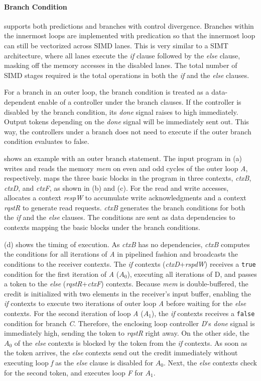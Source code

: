 \paragraph{Branch Condition}
\name supports both predictions and branches with control divergence.
Branches within the innermost loops are implemented with predication so that the innermost loop can still be
vectorized across SIMD lanes.
This is very similar to a SIMT architecture, where all lanes execute the \emph{if} clause followed
by the \emph{else} clause, masking off the memory accesses in the disabled lanes.
The total number of SIMD stages required is the total operations in both the \emph{if} and the \emph{else} clauses.

For a branch in an outer loop,
the branch condition is treated as a data-dependent enable of a controller under the branch clauses.
If the controller is disabled by the branch condition, its \emph{done} signal raises to high immediately.
Output tokens depending on the {\em done} signal will be immediately sent out.
This way, the controllers under a branch does not need to execute if the outer branch condition
evaluates to false.

 shows an example with an outer branch statement.
The input program in (a) writes and reads the memory \emph{mem} on even and odd cycles of
the outer loop \emph{A}, respectively. 
\name maps the three basic blocks in the program in three
contexts, \emph{ctxB}, \emph{ctxD}, and \emph{ctxF}, as shown in (b) and (c). 
For the read and write accesses, \name
allocates a context \emph{respW} to accumulate write acknowledgments and a context \emph{rqstR} 
to generate read requests. 
\emph{ctxB} generates the branch conditions for both the \emph{if} and the \emph{else} clauses.
The conditions are sent as data dependencies to contexts mapping the basic blocks under the branch conditions.

 (d) shows the timing of execution.
As \emph{ctxB} has no dependencies, \emph{ctxB} computes the conditions for all iterations of
\emph{A} in
pipelined fashion and broadcasts the conditions to the receiver contexts.
The \emph{if} contexts (\emph{ctxD}+\emph{rspdW}) receives a \texttt{true} condition for the first
iteration of \emph{A} ($A_0$), 
executing all iterations of D, and passes a token to the \emph{else} (\emph{rqstR}+\emph{ctxF}) contexts.
Because \emph{mem} is double-buffered, the credit is initialized with two elements in the
receiver's input buffer, enabling the \emph{if} contexts to execute two iterations of outer loop
\emph{A} before
waiting for the \emph{else} contexts. For the second iteration of loop \emph{A} ($A_1$), the \emph{if} contexts
receives a \texttt{false} condition for branch \emph{C}.
Therefore, the enclosing loop controller \emph{D}'s \emph{done} signal is immediately high, sending the
token to \emph{rqstR} right away.
On the other side, the $A_0$ of the \emph{else} contexts is blocked by the token from
the \emph{if} contexts. 
As soon as the token arrives, the \emph{else} contexts send out the credit immediately without
executing loop \emph{f} as the \emph{else} clause is disabled for $A_0$.
Next, the \emph{else} contexts check for the second token, 
and executes loop \emph{F} for $A_1$.

